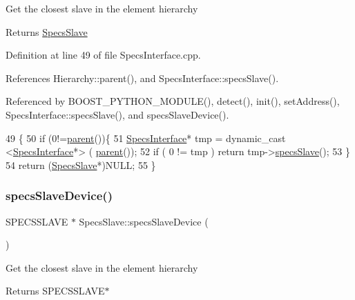 Get the closest slave in the element hierarchy \begin{DoxyReturn}{Returns}
\hyperlink{classSpecsSlave}{Specs\+Slave} 
\end{DoxyReturn}


Definition at line 49 of file Specs\+Interface.\+cpp.



References Hierarchy\+::parent(), and Specs\+Interface\+::specs\+Slave().



Referenced by B\+O\+O\+S\+T\+\_\+\+P\+Y\+T\+H\+O\+N\+\_\+\+M\+O\+D\+U\+L\+E(), detect(), init(), set\+Address(), Specs\+Interface\+::specs\+Slave(), and specs\+Slave\+Device().


\begin{DoxyCode}
49                                       \{
50     \textcolor{keywordflow}{if} (0!=\hyperlink{classHierarchy_a1c7bec8257e717f9c1465e06ebf845fc}{parent}())\{
51     \hyperlink{classSpecsInterface}{SpecsInterface}* tmp = dynamic\_cast <\hyperlink{classSpecsInterface}{SpecsInterface}*> (
      \hyperlink{classHierarchy_a1c7bec8257e717f9c1465e06ebf845fc}{parent}());
52     \textcolor{keywordflow}{if} ( 0 != tmp ) \textcolor{keywordflow}{return} tmp->\hyperlink{classSpecsInterface_a13cf39bddfa8ba21d6e6aa78e78f0e4f}{specsSlave}();
53   \}
54   \textcolor{keywordflow}{return} (\hyperlink{classSpecsSlave}{SpecsSlave}*)NULL; 
55 \}
\end{DoxyCode}
\mbox{\label{classSpecsSlave_a44970aca61b6fdcd6d6d90e6601093f3}} 
\subsubsection{\texorpdfstring{specs\+Slave\+Device()}{specsSlaveDevice()}}
{\footnotesize\ttfamily S\+P\+E\+C\+S\+S\+L\+A\+VE $\ast$ Specs\+Slave\+::specs\+Slave\+Device (\begin{DoxyParamCaption}{ }\end{DoxyParamCaption})\hspace{0.3cm}{\ttfamily [virtual]}}

Get the closest slave in the element hierarchy \begin{DoxyReturn}{Returns}
S\+P\+E\+C\+S\+S\+L\+A\+V\+E$\ast$ 
\end{DoxyReturn}


